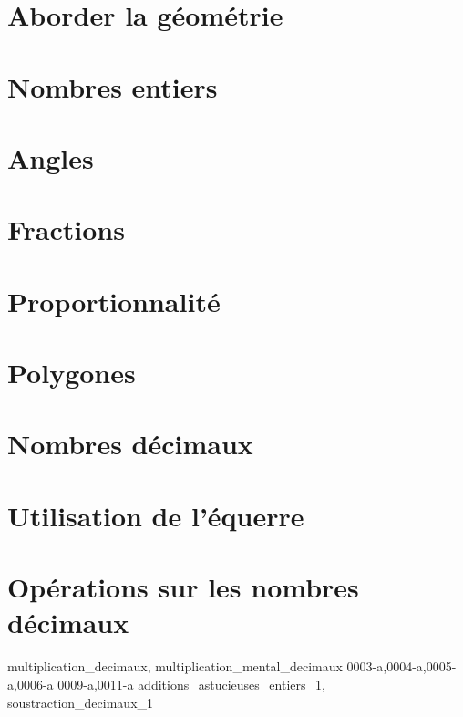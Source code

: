 \documentclass{main}
\begin{document}

        \chapter[aborder_la_geometrie]{Aborder la géométrie}

        \chapter[nombres_entiers]{Nombres entiers}

        \chapter[angles]{Angles}

        \chapter[fractions]{Fractions}

        \chapter[proportionnalite]{Proportionnalité}
        \punitions

        \chapter[polygones]{Polygones}

        \chapter[nombres_decimaux]{Nombres décimaux}
        \punitions

        \chapter[utilisation_equerre]{Utilisation de l'équerre}
            \devoirs

        \chapter[operations_decimaux]{Opérations sur les nombres décimaux}
            \cours
            \activites
            {
                multiplication_decimaux,
                multiplication_mental_decimaux%
            }
            \exercices
                \exerciceSheet
                    {0003-a,0004-a,0005-a,0006-a}
                    {0009-a,0011-a}
            \questionsFlash
            {
                additions_astucieuses_entiers_1,
                soustraction_decimaux_1%
            }
\end{document}
